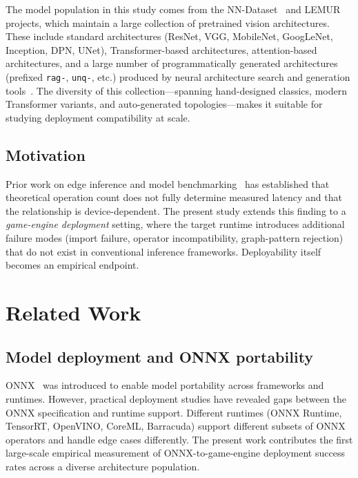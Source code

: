 \documentclass[10pt,twocolumn,letterpaper]{article}
\begin{document}
The model population in this study comes from the NN-Dataset~\cite{ABrain.NN-Dataset} and LEMUR~\cite{ABrain.LEMUR2} projects, which maintain a large collection of pretrained vision architectures. These include standard architectures (ResNet, VGG, MobileNet, GoogLeNet, Inception, DPN, UNet), Transformer-based architectures, attention-based architectures, and a large number of programmatically generated architectures (prefixed \texttt{rag-}, \texttt{unq-}, etc.) produced by neural architecture search and generation tools~\cite{ABrain.NNGPT, ABrain.NN-RAG}. The diversity of this collection---spanning hand-designed classics, modern Transformer variants, and auto-generated topologies---makes it suitable for studying deployment compatibility at scale.

\subsection{Motivation}

Prior work on edge inference and model benchmarking~\cite{ABrain.LEMUR2} has established that theoretical operation count does not fully determine measured latency and that the relationship is device-dependent. The present study extends this finding to a \emph{game-engine deployment} setting, where the target runtime introduces additional failure modes (import failure, operator incompatibility, graph-pattern rejection) that do not exist in conventional inference frameworks. Deployability itself becomes an empirical endpoint.

\section{Related Work}\label{sec:related}

\subsection{Model deployment and ONNX portability}

ONNX~\cite{onnx2019} was introduced to enable model portability across frameworks and runtimes. However, practical deployment studies have revealed gaps between the ONNX specification and runtime support. Different runtimes (ONNX Runtime, TensorRT, OpenVINO, CoreML, Barracuda) support different subsets of ONNX operators and handle edge cases differently. The present work contributes the first large-scale empirical measurement of ONNX-to-game-engine deployment success rates across a diverse architecture population.
\end{document}
